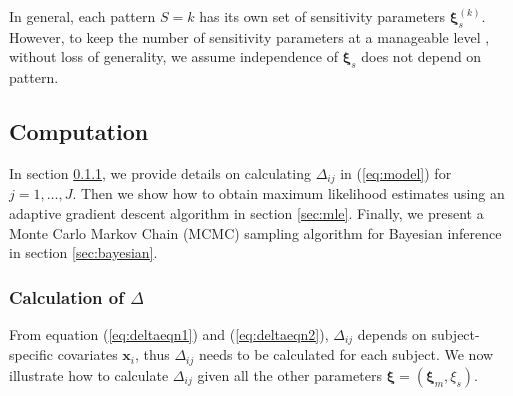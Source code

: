 \documentclass[12pt]{article}
\begin{document}
In general, each pattern $S = k$ has its own set of sensitivity
parameters $\bm \xi_s^{(k)}$. However, to keep the number of
sensitivity parameters at a manageable level \citep{dh2008}, without
loss of generality, we assume independence of $\bm \xi_s$ does not
depend on pattern.

\subsection{Computation}
\label{sec:computation}

In section \ref{sec:deltacal}, we provide details on calculating
$\Delta_{ij}$ in (\ref{eq:model}) for $j = 1, \ldots, J$. Then we show
how to obtain maximum likelihood estimates using an adaptive gradient
descent algorithm in section \ref{sec:mle}. Finally, we present a
Monte Carlo Markov Chain (MCMC) sampling algorithm for Bayesian
inference in section \ref{sec:bayesian}.

\subsubsection{Calculation of $\Delta$ }
\label{sec:deltacal}
From equation (\ref{eq:deltaeqn1}) and (\ref{eq:deltaeqn2}),
$\Delta_{ij}$ depends on subject-specific covariates $\bm x_i$, thus
$\Delta_{ij}$ needs to be calculated for each subject. We now
illustrate how to calculate $\Delta_{ij}$ given all the other
parameters $\bm \xi = (\bm \xi_m, \xi_s)$.
\end{document}
